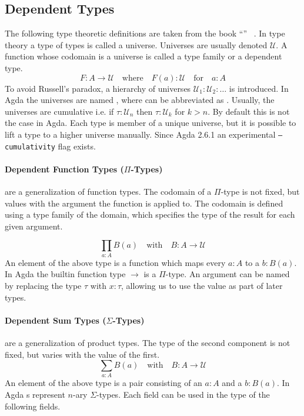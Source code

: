 \subsection{Dependent Types}
\label{preliminaries:dependent-types}
The following type theoretic definitions are taken from the
book ``'' ~\cite{hottbook}.
In type theory a type of types is called a universe.
Universes are usually denoted $\mathcal{U}$.
A function whose codomain is a universe is called a type family or a dependent
type.
$$
F : A \rightarrow \mathcal{U} \quad\text{where}\quad F(a) : \mathcal{U}
\quad\text{for}\quad a : A
$$
To avoid Russell's paradox, a hierarchy of universes $\mathcal{U}_1 :
\mathcal{U}_2 : \dots$ is introduced.
In Agda the universes are named , where 
can be abbreviated as .
Usually, the universes are cumulative i.e. if $\tau : \mathcal{U}_n$ then
$\tau : \mathcal{U}_k$ for $k>n$.
By default this is not the case in Agda.
Each type is member of a unique universe, but it is possible to lift a type to a
higher universe manually.
Since Agda 2.6.1 an experimental \texttt{--cumulativity} flag exists.

\paragraph{Dependent Function Types ($\Pi$-Types)} are a generalization of
function types.
The codomain of a $\Pi$-type is not fixed, but values with the argument the
function is applied to.
The codomain is defined using a type family of the domain, which specifies the
type of the result for each given argument.

$$
\prod_{a : A} B(a) \quad \text{with}\quad B : A \rightarrow\mathcal{U}
$$
An element of the above type is a function which maps every $a : A$ to a $b :
B(a)$.
In Agda the builtin function type $\rightarrow$ is a $\Pi$-type.
An argument can be named by replacing the type $\tau$ with $x : \tau$, allowing
us to use the value as part of later types.

\paragraph{Dependent Sum Types ($\Sigma$-Types)} are a generalization of product
types.
The type of the second component is not fixed, but varies with the value of the
first.
$$
\sum_{a : A} B(a) \quad \text{with}\quad B : A \rightarrow\mathcal{U}
$$
An element of the above type is a pair consisting of an $a : A$ and a $b : B(a)$.
In Agda s represent $n$-ary $\Sigma$-types.
Each field can be used in the type of the following fields.


